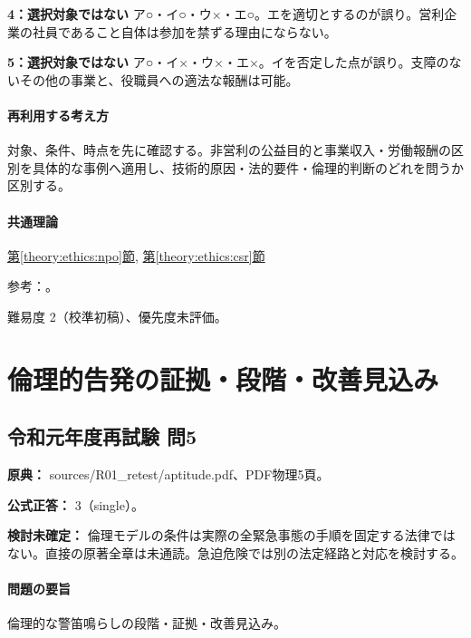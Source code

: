\noindent\textbf{4：選択対象ではない} ア○・イ○・ウ×・エ○。エを適切とするのが誤り。営利企業の社員であること自体は参加を禁ずる理由にならない。\par

\noindent\textbf{5：選択対象ではない} ア○・イ×・ウ×・エ×。イを否定した点が誤り。支障のないその他の事業と、役職員への適法な報酬は可能。\par

\paragraph{再利用する考え方} 対象、条件、時点を先に確認する。非営利の公益目的と事業収入・労働報酬の区別を具体的な事例へ適用し、技術的原因・法的要件・倫理的判断のどれを問うか区別する。

\paragraph{共通理論} \hyperref[theory:ethics:npo]{第\ref*{theory:ethics:npo}節}, \hyperref[theory:ethics:csr]{第\ref*{theory:ethics:csr}節}

\par 参考：\cite{cabinet_npo_overview,cabinet_npo_officers}。

\par 難易度 2（校準初稿）、優先度未評価。

\section{倫理的告発の証拠・段階・改善見込み}

\subsection{令和元年度再試験 問5}
\label{q:r01-ret-apt-05}

\noindent\textbf{原典：} sources/R01\_retest/aptitude.pdf、PDF物理5頁。

\textbf{公式正答：} 3（single）。

\par\textbf{検討未確定：} 倫理モデルの条件は実際の全緊急事態の手順を固定する法律ではない。直接の原著全章は未通読。急迫危険では別の法定経路と対応を検討する。

\paragraph{問題の要旨} 倫理的な警笛鳴らしの段階・証拠・改善見込み。

